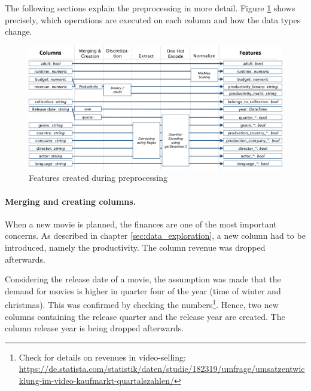 The following sections explain the preprocessing in more detail. Figure \ref{img:features} shows precisely, which operations are executed on each column and how the data types change.
\begin{figure}[h]
	\includegraphics[width=\textwidth]{images/3_features.png}
	\caption{Features created during preprocessing}
	\label{img:features}
\end{figure}
\FloatBarrier

\paragraph{Merging and creating columns.}
\label{sec:merge_create}
When a new movie is planned, the finances are one of the most important concerns. As described in chapter \ref{sec:data_exploration}, a new column had to be introduced, namely the productivity.
The column revenue was dropped afterwards.

Considering the release date of a movie, the assumption was made that the demand for movies is higher in quarter four of the year (time of winter and christmas). This was confirmed by checking the numbers\footnote{Check for details on revenues in video-selling:\\ \hyperref{https://de.statista.com/statistik/daten/studie/182319/umfrage/umsatzentwicklung-im-video-kaufmarkt-quartalszahlen/}{link}{Statista revenue movies}{https://de.statista.com/statistik/daten/studie/182319/umfrage/umsatzentwicklung-im-video-kaufmarkt-quartalszahlen/}}. Hence, two new columns containing the release quarter and the release year are created. The column release year is being dropped afterwards.

